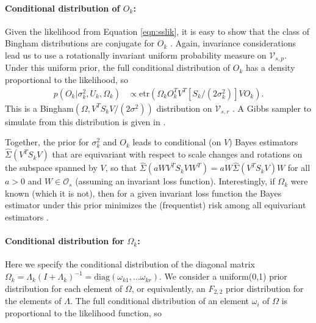 \documentclass[12pt]{article}
\newcommand{\etr}{\text{etr}}
\begin{document}
\paragraph{Conditional distribution of $O_k$:} Given the likelihood
from Equation \ref{eqn:sslik}, it is easy to show that the class of
Bingham distributions are conjugate for $O_k$ \citep{Hoff2009,
  Hoff2012}.  Again, invariance considerations lead us to use a
rotationally invariant uniform probability measure on
$\mathcal V_{s,p}$.  Under this uniform prior, the full conditional
distribution of $O_k$ has a density proportional to the
likelihood, so
\begin{align}
\label{lik_vo}
 p(O_k | \sigma^2_k, U_k, \Omega_k) & \propto \etr(\Omega_kO^T_kV^T[S_k/(2\sigma^2_k)]VO_k).
\end{align}
%
\noindent This is a Bingham$(\Omega, V^T S_k V/(2\sigma^2))$
distribution on $\mathcal V_{s, r}$ \citep{Khatri1977}. A
Gibbs sampler to simulate from this distribution is given in
\citet{Hoff2012}.  

Together, the prior for $\sigma_k^2$ and $O_k$ leads to conditional
(on $V$) Bayes estimators $\hat \Sigma(V^T S_k V)$ that are
equivariant with respect to scale changes and rotations on the
subspace spanned by $V$, so
that $\hat \Sigma(a W V^T S_k V W^T) = a W \hat\Sigma(V^T
S_k V)  W$
for all $a>0$ and $ W\in \mathcal O_{s}$ (assuming an invariant
loss function). Interestingly, if $\Omega_k$ were known (which it is
not), then for a given invariant loss function the Bayes estimator
under this prior minimizes the (frequentist) risk among all
equivariant estimators \citep{Eaton1989}.

\paragraph{Conditional distribution for $\Omega_k$:} Here we specify the
conditional distribution of the diagonal matrix
$\Omega_k = \Lambda_k(I+\Lambda_k)^{-1} = \text{diag}(\omega_{k1},
... \omega_{kr})$.
We consider a uniform(0,1) prior distribution for each element of
$\Omega$, or equivalently, an $F_{2,2}$ prior distribution for the
elements of $\Lambda$.  The full conditional distribution of an
element $\omega_i$ of $\Omega$ is proportional to the likelihood
function, so
\end{document}
